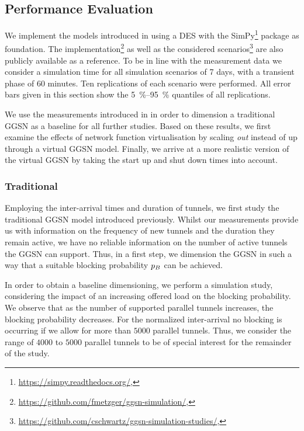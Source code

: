 \subsection{Performance Evaluation}\label{sec:cloud:virtualized_network_functions:performance_evaluation}

We implement the models introduced in  using a \gls{DES} with the SimPy\footnote{\url{https://simpy.readthedocs.org/}, \accessed} package as foundation.
The implementation\footnote{\url{https://github.com/fmetzger/ggsn-simulation/}, \accessed} as well as the considered scenarios\footnote{\url{https://github.com/cschwartz/ggsn-simulation-studies/}, \accessed} are also publicly available as a reference.
To be in line with the measurement data we consider a simulation time for all simulation scenarios of 7 days, with a transient phase of 60 minutes.
Ten replications of each scenario were performed.
All error bars given in this section show the \SIrange{5}{95}{\percent} quantiles of all replications.

We use the measurements introduced in  in order to dimension a traditional \gls{GGSN} as a baseline for all further studies.
Based on these results, we first examine the effects of network function virtualisation by scaling \emph{out} instead of up through a virtual \gls{GGSN} model.
Finally, we arrive at a more realistic version of the virtual \gls{GGSN} by taking the start up and shut down times into account.

\subsubsection*{Traditional }\label{sec:cloud:virtualized_network_functions:performance_evaluation:traditional_ggsn}

Employing the inter-arrival times and duration of tunnels, we first study the traditional \gls{GGSN} model introduced previously.
Whilst our measurements provide us with information on the frequency of new tunnels and the duration they remain active, we have no reliable information on the number of active tunnels the \gls{GGSN} can support.
Thus, in a first step, we dimension the \gls{GGSN} in such a way that a suitable blocking probability \(p_B\) can be achieved.


In order to obtain a baseline dimensioning, we perform a simulation study, considering the impact of an increasing offered load on the blocking probability.
We observe that as the number of supported parallel tunnels increases, the blocking probability decreases.
For the normalized inter-arrival no blocking is occurring if we allow for more than \(5000\) parallel tunnels.
Thus, we consider the range of \(4000\) to \(5000\) parallel tunnels to be of special interest for the remainder of the study.

